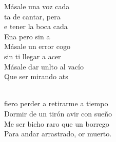 \begin{cancion}
	\begin{chorus}%
	Másale una voz cada\\
	ta de cantar, pera\\
	e tener la boca cada\\
	Ena pero sin a\\
	Másale un error cogo\\
	 sin ti llegar a acer\\
	Másale dar unlto al vacío  \\
	Que ser mirando ats\\
	\end{chorus}%
	\jump\\
	fiero perder a retirarme a tiempo\\
	Dormir de un tirón avir con sueño\\
	Me ser bicho raro que un borrego\\
	Para andar arrastrado, or muerto.\\
\end{cancion}%
